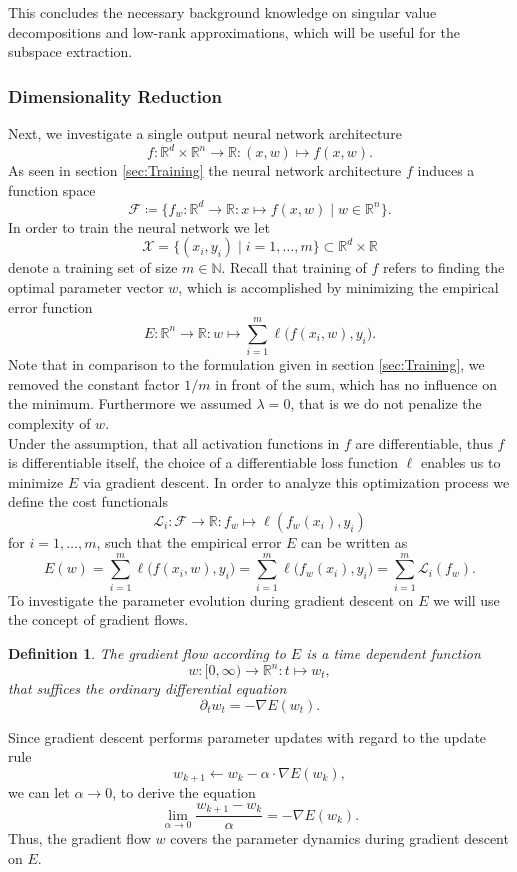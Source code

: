 \documentclass[11pt, a4paper]{article}
\newtheorem{definition}[theorem]{Definition}
\newcommand{\N}{\mathds{N}}
\newcommand{\R}{\mathds{R}}
\newcommand{\F}{\mathcal{F}}
\newcommand{\X}{\mathcal{X}}
\renewcommand{\L}{\mathcal{L}}
\begin{document}
This concludes the necessary background knowledge on singular value decompositions and low-rank approximations, which will be useful for the subspace extraction.

\subsubsection{Dimensionality Reduction}

Next, we investigate a single output neural network architecture 
\[ f: \R^d \times \R^n \to \R : (x,w) \mapsto f(x,w). \]
As seen in section \ref{sec:Training} the neural network architecture $f$ induces a function space
\[ \F \coloneq \Big \{ f_w : \R^d \to \R : x \mapsto f(x,w) \mid w \in \R^n \Big \}. \]
In order to train the neural network we let
\[ \X = \big \{ (x_i,y_i) \mid i=1, \dots, m \big \} \subset \R^d \times \R \] 
denote a training set of size $m \in \N$. Recall that training of $f$ refers to finding the optimal parameter vector $w$, which is accomplished by minimizing the empirical error function
\[ E : \R^n \to \R : w \mapsto \sum_{i=1}^{m} \ell \big (f(x_i,w), y_i \big ). \]
Note that in comparison to the formulation given in section \ref{sec:Training}, we removed the constant factor $1/m$ in front of the sum, which has no influence on the minimum. Furthermore we assumed $\lambda = 0$, that is we do not penalize the complexity of $w$. \\

Under the assumption, that all activation functions in $f$ are differentiable, thus $f$ is differentiable itself, the choice of a differentiable loss function $\ell$ enables us to minimize $E$ via gradient descent. In order to analyze this optimization process we define the cost functionals
\[ \L_i: \F \to \R : f_w \mapsto \ell(f_w(x_i),y_i) \]
for $i=1, \dots,m$, such that the empirical error $E$ can be written as
\[ E(w) = \sum_{i=1}^{m} \ell \big (f(x_i,w), y_i \big ) = \sum_{i=1}^{m} \ell \big (f_w(x_i), y_i \big ) = \sum_{i=1}^{m} \L_i(f_w). \]
To investigate the parameter evolution during gradient descent on $E$ we will use the concept of gradient flows.

\begin{definition} \label{def:flow}
The gradient flow according to $E$ is a time dependent function
\[ w: [0, \infty) \to \R^n : t \mapsto w_t, \]
that suffices the ordinary differential equation
\[ \partial_t w_t = - \nabla E(w_t). \]
\end{definition}

Since gradient descent performs parameter updates with regard to the update rule
\[ w_{k+1} \leftarrow w_k - \alpha \cdot \nabla E(w_k), \]
we can let $\alpha \to 0$, to derive the equation
\[ \lim_{\alpha \to 0} \frac{w_{k+1} - w_k}{\alpha} = - \nabla E(w_k). \]
Thus, the gradient flow $w$ covers the parameter dynamics during gradient descent on $E$.
\end{document}
